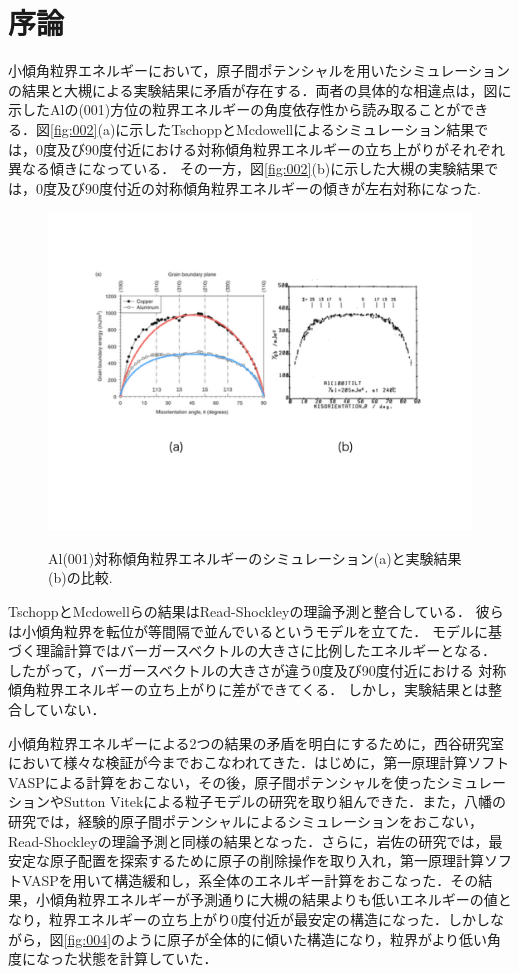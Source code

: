 
\section{序論}
小傾角粒界エネルギーにおいて，原子間ポテンシャルを用いたシミュレーションの結果と大槻による実験結果に矛盾が存在する．両者の具体的な相違点は，図に示したAlの(001)方位の粒界エネルギーの角度依存性から読み取ることができる．図\ref{fig:002}(a)に示したTschoppとMcdowellによるシミュレーション結果では，0度及び90度付近における対称傾角粒界エネルギーの立ち上がりがそれぞれ異なる傾きになっている\cite{TschoppMcdowell}．
その一方，図\ref{fig:002}(b)に示した大槻の実験結果では，0度及び90度付近の対称傾角粒界エネルギーの傾きが左右対称になった\cite{Otsuki}.

\begin{figure}[htbp]\begin{center}
\includegraphics[width=12cm,bb= 0 0 937 753]{../figs/./boundary_narita.002.jpeg}
\caption{Al(001)対称傾角粒界エネルギーのシミュレーション(a)と実験結果(b)の比較.}
\label{fig:002}
\label{default}\end{center}\end{figure}
TschoppとMcdowellらの結果はRead-Shockleyの理論予測と整合している．
彼らは小傾角粒界を転位が等間隔で並んでいるというモデルを立てた\cite{ReadShockley}．
モデルに基づく理論計算ではバーガースベクトルの大きさに比例したエネルギーとなる．
したがって，バーガースベクトルの大きさが違う0度及び90度付近における
対称傾角粒界エネルギーの立ち上がりに差ができてくる．
しかし，実験結果とは整合していない．

小傾角粒界エネルギーによる2つの結果の矛盾を明白にするために，西谷研究室において様々な検証が今までおこなわれてきた．はじめに，第一原理計算ソフトVASPによる計算をおこない，その後，原子間ポテンシャルを使ったシミュレーションやSutton Vitekによる粒子モデルの研究を取り組んできた\cite{Murakami}．また，八幡の研究では，経験的原子間ポテンシャルによるシミュレーションをおこない，Read-Shockleyの理論予測と同様の結果となった\cite{Yahata}．さらに，岩佐の研究では，最安定な原子配置を探索するために原子の削除操作を取り入れ，第一原理計算ソフトVASPを用いて構造緩和し，系全体のエネルギー計算をおこなった\cite{Iwasa}．その結果，小傾角粒界エネルギーが予測通りに大槻の結果よりも低いエネルギーの値となり，粒界エネルギーの立ち上がり0度付近が最安定の構造になった．しかしながら，図\ref{fig:004}のように原子が全体的に傾いた構造になり，粒界がより低い角度になった状態を計算していた．


